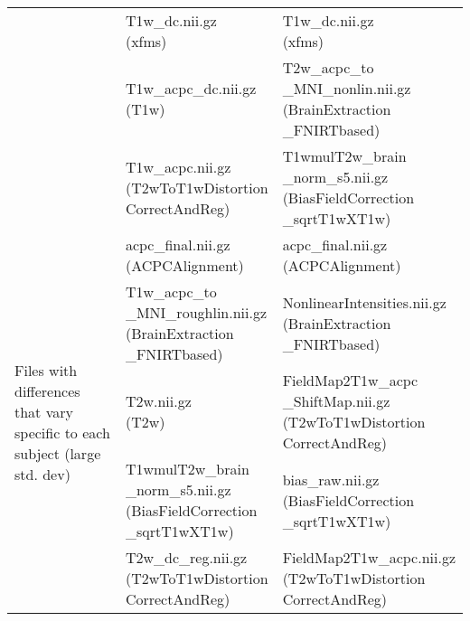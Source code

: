 \begin{center}
\begin{longtable}{|p{}|p{}|p{}|}
& \makecell[l]{T1w\_dc.nii.gz\\(xfms)}                           & \makecell[l]{T1w\_dc.nii.gz\\(xfms)} \\\cline{2-3}
& \makecell[l]{T1w\_acpc\_dc.nii.gz\\(T1w)}                      & \makecell[l]{T2w\_acpc\_to \\ \_MNI\_nonlin.nii.gz\\(BrainExtraction\\\_FNIRTbased)} \\\cline{2-3}
& \makecell[l]{T1w\_acpc.nii.gz\\(T2wToT1wDistortion\\CorrectAndReg)}  & \makecell[l]{T1wmulT2w\_brain\\\_norm\_s5.nii.gz\\(BiasFieldCorrection\\\_sqrtT1wXT1w)} \\\cline{1-3}
\multirow{5}{.2\textwidth}{Files with differences that vary specific to each subject (large std. dev)}   & \makecell[l]{acpc\_final.nii.gz\\(ACPCAlignment)}  & \makecell[l]{acpc\_final.nii.gz\\(ACPCAlignment)} \\\cline{2-3}
& \makecell[l]{T1w\_acpc\_to \\ \_MNI\_roughlin.nii.gz\\(BrainExtraction\\\_FNIRTbased)}                 & \makecell[l]{NonlinearIntensities.nii.gz\\(BrainExtraction\\\_FNIRTbased)} \\\cline{2-3}
& \makecell[l]{T2w.nii.gz\\(T2w)}                                                            & \makecell[l]{FieldMap2T1w\_acpc \\ \_ShiftMap.nii.gz\\(T2wToT1wDistortion\\CorrectAndReg)} \\\cline{2-3}
  & \makecell[l]{T1wmulT2w\_brain \\ \_norm\_s5.nii.gz\\(BiasFieldCorrection\\\_sqrtT1wXT1w)}                   & \makecell[l]{bias\_raw.nii.gz\\(BiasFieldCorrection\\\_sqrtT1wXT1w)} \\\cline{2-3}
  & \makecell[l]{T2w\_dc\_reg.nii.gz\\(T2wToT1wDistortion\\CorrectAndReg)}                                                   & \makecell[l]{FieldMap2T1w\_acpc.nii.gz\\(T2wToT1wDistortion\\CorrectAndReg)} \\\cline{1-3}
\end{longtable}
\label{tab:PreFreeSurfer_comparison_table}
\end{center}
